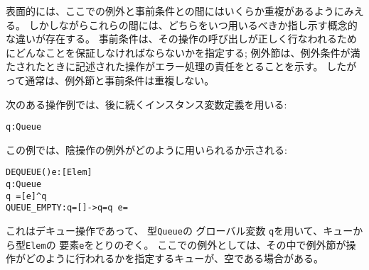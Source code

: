 \documentclass[\pformat,12pt]{jarticle}
\begin{document}
\begin{description}
表面的には、ここでの例外と事前条件との間にはいくらか重複があるようにみえる。
しかしながらこれらの間には、どちらをいつ用いるべきか指し示す概念的な違いが存在する。 
事前条件は、その操作の呼び出しが正しく行なわれるためにどんなことを保証しなければならないかを指定する; 例外節は、例外条件が満たされたときに記述された操作がエラー処理の責任をとることを示す。
したがって通常は、例外節と事前条件は重複しない。

次のある操作例では、後に続くインスタンス変数定義を用いる:
\begin{alltt}
    q : Queue
\end{alltt}    
この例では、陰操作の例外がどのように用いられるか示される:
\begin{alltt}
  DEQUEUE() e: [Elem]
    q : Queue
   q~ = [e] ^ q
   QUEUE_EMPTY: q = [] -> q = q~  e = 
\end{alltt}

これはデキュー操作であって、 型{\tt Queue}の グローバル変数 {\tt q}を用いて、キューから型{\tt Elem}の 要素{\tt e}をとりのぞく。 
ここでの例外としては、その中で例外節が操作がどのように行われるかを指定するキューが、空である場合がある。



%
%


\end{description}
\end{document}
